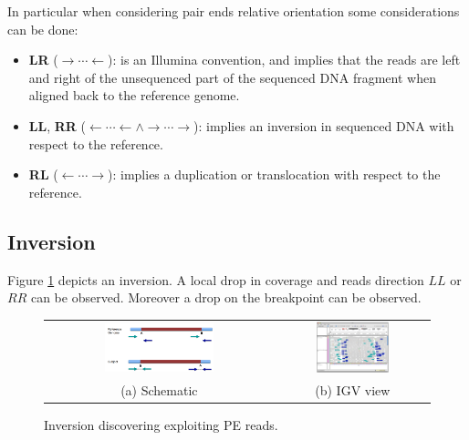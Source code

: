     In particular when considering pair ends relative orientation some considerations can be done:

    \begin{multicols}{2}
        \begin{itemize}
            \item \textbf{LR} ($\rightarrow\cdots\leftarrow$): is an Illumina convention, and implies that the reads are left and right of the unsequenced part of the sequenced DNA fragment when aligned back to the reference genome.
            \item \textbf{LL}, \textbf{RR} ($\leftarrow\cdots\leftarrow\land\rightarrow\cdots\rightarrow$): implies an inversion in sequenced DNA with respect to the reference.
            \item \textbf{RL} ($\leftarrow\cdots\rightarrow$): implies a duplication or translocation with respect to the reference.
        \end{itemize}
    \end{multicols}

    \subsection{Inversion}
    Figure \ref{fig:inversion} depicts an inversion.
    A local drop in coverage and reads direction $LL$ or $RR$ can be observed.
    Moreover a drop on the breakpoint can be observed.

    \begin{figure}[H]
        \begin{tabular}{cc}
            \includegraphics[width=0.5\textwidth]{inversion.png} &   \includegraphics[width=0.5\textwidth]{inversion_igv.png} \\
            (a) Schematic & (b) IGV view \\[6pt]
        \end{tabular}
        \caption{Inversion discovering exploiting PE reads.}
        \label{fig:inversion}
    \end{figure}

